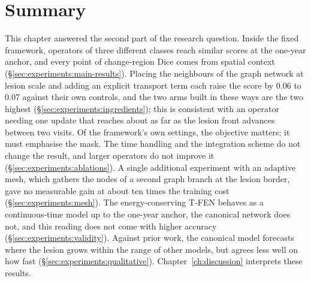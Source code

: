 \section{Summary}
\label{sec:experiments:summary}

This chapter answered the second part of the research question. Inside
the fixed framework, operators of three different classes reach similar
scores at the one-year anchor, and every point of change-region Dice comes
from spatial context (\S\ref{sec:experiments:main-results}). Placing the
neighbours of the graph network at lesion scale and adding an explicit
transport term each raise the score by 0.06 to 0.07 against their own
controls, and the two arms built in these ways are the two highest
(\S\ref{sec:experiments:ingredients}); this is consistent with an operator
needing one update that reaches about as far as the lesion front advances
between two visits. Of the framework's own settings, the objective
matters: it must emphasise the mask. The time handling and the
integration scheme do not change the result, and larger operators do not
improve it (\S\ref{sec:experiments:ablations}). A single additional
experiment with an adaptive mesh, which gathers the nodes of a second
graph branch at the lesion border, gave no measurable gain at about ten
times the training cost (\S\ref{sec:experiments:mesh}). The energy-conserving T-FEN behaves
as a continuous-time model up to the one-year anchor, the canonical
network does not, and this reading does not come with higher accuracy
(\S\ref{sec:experiments:validity}). Against prior work, the canonical
model forecasts where the lesion grows within the range of other models,
but agrees less well on how fast (\S\ref{sec:experiments:qualitative}).
Chapter~\ref{ch:discussion} interprets these results.



